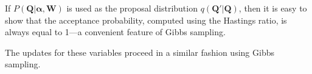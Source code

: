 If $P(\bm{Q}|\bm{\alpha}, \bm{W})$ is used as the proposal distribution $q(\bm{Q'}|\bm{Q})$, then it is easy to show that the acceptance probability, computed using the Hastings ratio, is always equal to 1---a convenient feature of Gibbs sampling.  

The updates for these variables proceed in a similar fashion using Gibbs sampling.  


